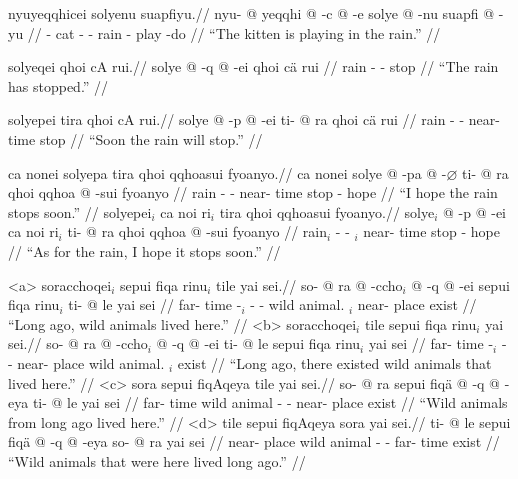 \documentclass{article}
\begin{document}
\ex[lingstyle=QuCheanya] 
\begingl
\glpreamble nyuyeqqhicei solyenu suapfiyu.//
\gla nyu- @ yeqqhi @ -c @ -e solye @ -nu suapfi @ -yu //
\glb {}- cat - - rain - play -do //
\glft ``The kitten is playing in the rain.'' //
\endgl 
\xe

\ex[lingstyle=QuCheanya] \begingl
\glpreamble solyeqei qhoi cA rui.//
\gla solye @ -q @ -ei qhoi c\"a rui //
\glb rain - - stop   //
\glft ``The rain has stopped.'' //
\endgl \xe

\ex[lingstyle=QuCheanya] \begingl
\glpreamble solyepei tira qhoi cA rui.//
\gla solye @ -p @ -ei ti- @ ra qhoi c\"a rui //
\glb rain - - near- time stop   //
\glft ``Soon the rain will stop.'' //
\endgl \xe

\pex[lingstyle=QuCheanya] 
\a \begingl
\glpreamble ca nonei solyepa tira qhoi qqhoasui fyoanyo.//
\gla ca nonei solye @ -pa @ -$\varnothing$ ti- @ ra qhoi qqhoa @ -sui fyoanyo //
\glb {}  rain - - near- time stop  - hope //
\glft ``I hope the rain stops soon.'' //
\endgl
\a \begingl
\glpreamble solyepei$_i$ ca noi ri$_i$ tira qhoi qqhoasui fyoanyo.//
\gla solye$_i$ @ -p @ -ei ca noi ri$_i$ ti- @ ra qhoi qqhoa @ -sui fyoanyo //
\glb rain$_i$ - -   $_i$ near- time stop  - hope //
\glft ``As for the rain, I hope it stops soon.'' //
\endgl \xe

\pex[lingstyle=QuCheanya,tag=animals] 
\a<a> \begingl
\glpreamble soracchoqei$_i$ sepui fiqa rinu$_i$ tile yai sei.//
\gla so- @ ra @ -ccho$_i$ @ -q @ -ei sepui fiqa rinu$_i$ ti- @ le yai sei //
\glb far- time -$_i$ - - wild animal. $_i$ near- place exist  //
\glft ``Long ago, wild animals lived here.'' //
\endgl 
\a<b> \begingl
\glpreamble soracchoqei$_i$ tile sepui fiqa rinu$_i$ yai sei.//
\gla so- @ ra @ -ccho$_i$ @ -q @ -ei ti- @ le sepui fiqa rinu$_i$ yai sei //
\glb far- time -$_i$ - - near- place wild animal. $_i$ exist  //
\glft ``Long ago, there existed wild animals that lived here.'' //
\endgl
\a<c> \begingl
\glpreamble sora sepui fiqAqeya tile yai sei.//
\gla so- @ ra sepui fiq\"a @ -q @ -eya ti- @ le yai sei //
\glb far- time wild animal - - near- place exist  //
\glft ``Wild animals from long ago lived here.'' //
\endgl
\a<d> \begingl
\glpreamble tile sepui fiqAqeya sora yai sei.//
\gla ti- @ le sepui fiq\"a @ -q @ -eya so- @ ra yai sei //
\glb near- place wild animal - - far- time exist  //
\glft ``Wild animals that were here lived long ago.'' //
\endgl
\xe
\end{document}
